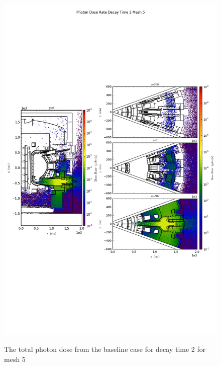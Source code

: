 \begin{figure}[ht!]
\centering
\includegraphics[trim={0cm 9cm 0cm 10cm},clip,scale=0.75]{../plots/final_model_nob4c/Photon_Dose_Rate_Decay_Time_2_Mesh_5.png}
\label{fig:photons_dc2_no4bc_m5_flux}
\caption{The total photon dose from the baseline case for decay time 2 for mesh 5}
\end{figure}
